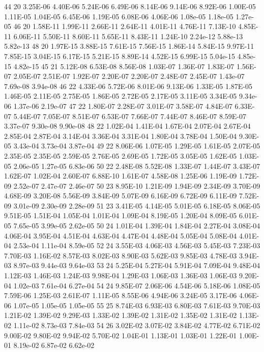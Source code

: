 44 20 	3.25E-06	4.40E-06	5.24E-06	6.49E-06	8.14E-06	9.14E-06	8.92E-06	1.00E-05	1.11E-05	1.04E-05	6.45E-06	1.19E-05	6.08E-06	4.06E-06	1.08e-05	1.18e-05	1.27e-05
46 20 	1.58E-11	1.99E-11	2.66E-11	2.64E-11	4.01E-11	4.76E-11	7.13E-10	4.85E-11	6.06E-11	5.50E-11	8.60E-11	5.65E-11	8.43E-11	1.24E-10	2.24e-12	5.88e-13	5.82e-13
48 20 	1.97E-15	3.88E-15	7.61E-15	7.56E-15	1.86E-14	5.84E-15	9.97E-11	7.85E-15	3.04E-15	6.17E-15	5.21E-15	8.89E-14	4.52E-15	6.99E-15	5.04e-15	4.85e-15	4.82e-15
45 21 	5.12E-08	6.53E-08	8.56E-08	1.03E-07	1.36E-07	1.83E-07	1.56E-07	2.05E-07	2.51E-07	1.92E-07	2.20E-07	2.20E-07	2.48E-07	2.45E-07	1.43e-07	7.69e-08	3.94e-08
46 22 	4.33E-06	5.72E-06	8.01E-06	9.13E-06	1.33E-05	1.87E-05	1.46E-05	2.11E-05	2.75E-05	1.86E-05	2.72E-05	2.17E-05	3.11E-05	3.34E-05	9.34e-06	1.37e-06	2.19e-07
47 22 	1.80E-07	2.28E-07	3.01E-07	3.58E-07	4.84E-07	6.33E-07	5.44E-07	7.05E-07	8.51E-07	6.53E-07	7.66E-07	7.44E-07	8.46E-07	8.59E-07	3.37e-07	9.30e-08	9.90e-08
48 22 	1.02E-04	1.41E-04	1.67E-04	2.07E-04	2.67E-04	2.85E-04	2.87E-04	3.14E-04	3.36E-04	3.31E-04	1.80E-04	3.78E-04	1.50E-04	9.30E-05	3.43e-04	3.73e-04	3.87e-04
49 22 	8.06E-06	1.07E-05	1.29E-05	1.61E-05	2.07E-05	2.35E-05	2.35E-05	2.59E-05	2.76E-05	2.69E-05	1.72E-05	3.05E-05	1.62E-05	1.03E-05	2.06e-05	1.27e-05	6.83e-06
50 22 	2.48E-08	5.52E-08	1.33E-07	1.44E-07	3.43E-07	1.62E-07	1.02E-04	2.60E-07	6.88E-10	1.61E-07	4.58E-08	1.25E-06	1.19E-09	1.72E-09	2.52e-07	2.47e-07	2.46e-07
50 23  	8.95E-10	1.21E-09	1.94E-09	2.34E-09	3.70E-09	4.68E-09	3.20E-08	5.56E-09	3.84E-09	5.07E-09	6.16E-09	6.72E-09	6.11E-09	7.52E-09	3.01e-09	2.30e-09	2.28e-09
51 23  	3.41E-05	4.14E-05	5.01E-05	6.18E-05	8.06E-05	9.51E-05	1.51E-04	1.05E-04	1.01E-04	1.09E-04	8.19E-05	1.20E-04	8.09E-05	6.01E-05	7.65e-05	3.99e-05	2.62e-05
50 24 	1.01E-04	1.39E-04	1.84E-04	2.27E-04	3.08E-04	4.06E-04	3.95E-04	4.51E-04	4.63E-04	4.47E-04	4.48E-04	5.05E-04	5.08E-04	4.01E-04	2.53e-04	1.11e-04	8.59e-05
52 24 	3.55E-03	4.06E-03	4.56E-03	5.45E-03	7.23E-03	7.70E-03	1.16E-02	8.57E-03	8.02E-03	8.90E-03	5.62E-03	9.85E-03	4.78E-03	3.94E-03	8.97e-03	9.44e-03	9.64e-03
53 24 	5.25E-04	5.27E-04	5.91E-04	7.09E-04	9.48E-04	1.12E-03	1.46E-03	1.24E-03	9.98E-04	1.29E-03	1.06E-03	1.36E-03	1.06E-03	9.20E-04	1.02e-03	7.61e-04	6.27e-04
54 24 	9.85E-07	2.06E-06	4.54E-06	5.18E-06	1.08E-05	7.59E-06	1.25E-03	2.61E-07	1.11E-05	8.55E-06	4.94E-06	3.24E-05	3.17E-06	4.06E-06	1.07e-05	1.05e-05	1.05e-05
55 25 	8.74E-03	6.93E-03	6.80E-03	7.61E-03	9.70E-03	1.21E-02	1.39E-02	9.29E-03	1.33E-02	1.39E-02	1.31E-02	1.35E-02	1.31E-02	1.13E-02	1.11e-02	8.73e-03	7.84e-03
54 26 	3.02E-02	3.07E-02	3.84E-02	4.77E-02	6.71E-02	9.00E-02	9.80E-02	9.94E-02	5.70E-02	1.04E-01	1.13E-01	1.03E-01	1.22E-01	1.00E-01	8.19e-02	6.87e-02	6.62e-02
